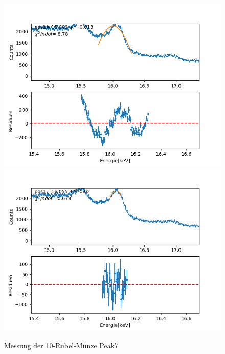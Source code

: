 \documentclass[12pt,a4paper]{article}
\begin{document}
\begin{figure}[H]
\centering
\includegraphics[scale=0.49]{Bilder/roentgen_spektren/rubel/rub8_1.png}
\includegraphics[scale=0.49]{Bilder/roentgen_spektren/rubel/rub8_2.png}
\caption{Messung der 10-Rubel-Münze Peak7}
\end{figure}

\newpage
\end{document}
